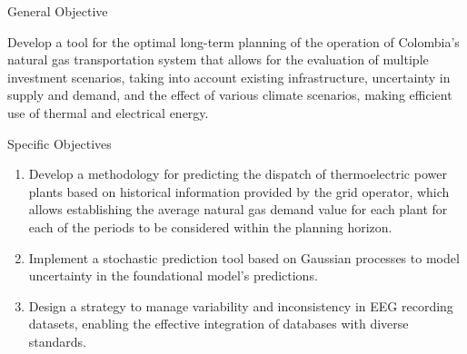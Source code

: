 \documentclass[aspectratio=169,12pt]{beamer}
\begin{document}
\frame{\titlepage}

\begin{frame}{General Objective}
	\begin{block}{}
		Develop a tool for the optimal long-term planning of the operation of Colombia's natural gas transportation system that allows for the evaluation of multiple investment scenarios, taking into account existing infrastructure, uncertainty in supply and demand, and the effect of various climate scenarios, making efficient use of thermal and electrical energy.
	\end{block}
\end{frame}

\begin{frame}{Specific Objectives}
	\begin{block}{}
		\begin{enumerate}
			\item Develop a methodology for predicting the dispatch of thermoelectric power plants based on historical information provided by the grid operator, which allows establishing the average natural gas demand value for each plant for each of the periods to be considered within the planning horizon.
			
			\item Implement a \textcolor{MyAccent}{stochastic prediction} tool based on Gaussian processes to model uncertainty in the foundational model's predictions.
			\item Design a strategy to \textcolor{MyAccent}{manage variability and inconsistency} in EEG recording datasets, enabling the effective integration of databases with diverse standards.
		\end{enumerate}
	\end{block}
\end{frame}
	
\end{document}

